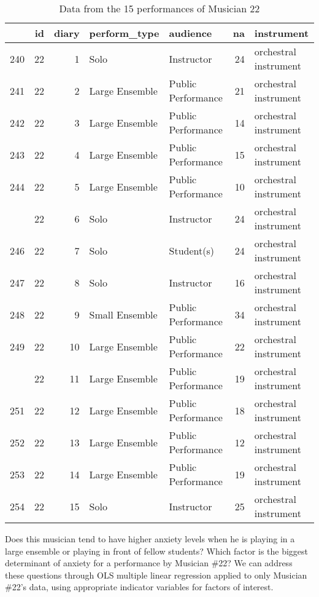 \documentclass[
]{krantz}
\begin{document}
\begin{table}

\caption{\label{tab:table2chp8}Data from the 15 performances of Musician 22}
\centering
\begin{tabular}[t]{lrrllrl}
\toprule
  & id & diary & perform\_type & audience & na & instrument\\
\midrule
240 & 22 & 1 & Solo & Instructor & 24 & orchestral instrument\\
241 & 22 & 2 & Large Ensemble & Public Performance & 21 & orchestral instrument\\
242 & 22 & 3 & Large Ensemble & Public Performance & 14 & orchestral instrument\\
243 & 22 & 4 & Large Ensemble & Public Performance & 15 & orchestral instrument\\
244 & 22 & 5 & Large Ensemble & Public Performance & 10 & orchestral instrument\\
\addlinespace
245 & 22 & 6 & Solo & Instructor & 24 & orchestral instrument\\
246 & 22 & 7 & Solo & Student(s) & 24 & orchestral instrument\\
247 & 22 & 8 & Solo & Instructor & 16 & orchestral instrument\\
248 & 22 & 9 & Small Ensemble & Public Performance & 34 & orchestral instrument\\
249 & 22 & 10 & Large Ensemble & Public Performance & 22 & orchestral instrument\\
\addlinespace
250 & 22 & 11 & Large Ensemble & Public Performance & 19 & orchestral instrument\\
251 & 22 & 12 & Large Ensemble & Public Performance & 18 & orchestral instrument\\
252 & 22 & 13 & Large Ensemble & Public Performance & 12 & orchestral instrument\\
253 & 22 & 14 & Large Ensemble & Public Performance & 19 & orchestral instrument\\
254 & 22 & 15 & Solo & Instructor & 25 & orchestral instrument\\
\bottomrule
\end{tabular}
\end{table}

Does this musician tend to have higher anxiety levels when he is playing in a large ensemble or playing in front of fellow students? Which factor is the biggest determinant of anxiety for a performance by Musician \#22? We can address these questions through OLS multiple linear regression applied to only Musician \#22's data, using appropriate indicator variables for factors of interest.
\end{document}
